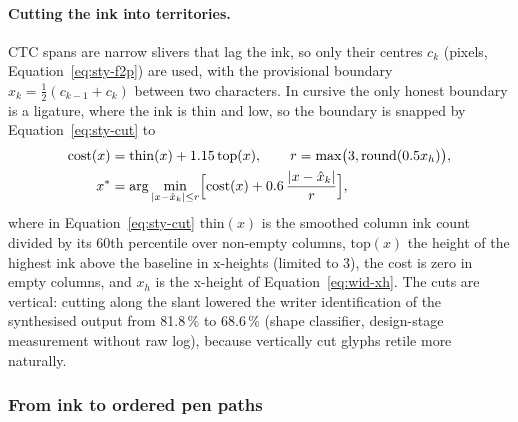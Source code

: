 \paragraph{Cutting the ink into territories.}
CTC spans are narrow slivers that lag the ink, so only their centres $c_k$ (pixels, Equation~\ref{eq:sty-f2p}) are used, with the provisional boundary $\hat x_k=\tfrac12(c_{k-1}+c_k)$ between two characters.
In cursive the only honest boundary is a ligature, where the ink is thin and low, so the boundary is snapped by Equation~\ref{eq:sty-cut} to
\begin{equation}
\begin{aligned}
\mathrm{cost}(x)&=\mathrm{thin}(x)+1.15\,\mathrm{top}(x),\qquad r=\max\bigl(3,\mathrm{round}(0.5x_h)\bigr),\\
x^*&=\arg\min_{|x-\hat x_k|\le r}\Bigl[\mathrm{cost}(x)+0.6\,\frac{|x-\hat x_k|}{r}\Bigr],
\end{aligned}
\label{eq:sty-cut}
\end{equation}
where in Equation~\ref{eq:sty-cut} $\mathrm{thin}(x)$ is the smoothed column ink count divided by its 60th percentile over non-empty columns, $\mathrm{top}(x)$ the height of the highest ink above the baseline in x-heights (limited to 3), the cost is zero in empty columns, and $x_h$ is the x-height of Equation~\ref{eq:wid-xh}.
The cuts are vertical: cutting along the slant lowered the writer identification of the synthesised output from 81.8\,\% to 68.6\,\% (shape classifier, design-stage measurement without raw log), because vertically cut glyphs retile more naturally.

\subsubsection{From ink to ordered pen paths}

